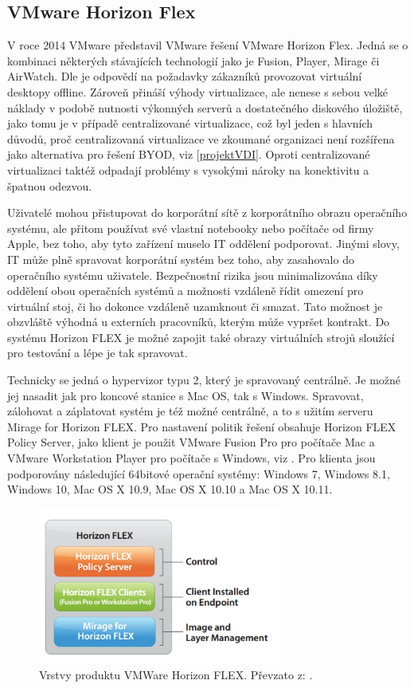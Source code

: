 \subsection{VMware Horizon Flex}
V roce 2014 VMware představil VMware řešení VMware Horizon Flex. Jedná se o kombinaci některých stávajících technologií jako je Fusion, Player, Mirage či AirWatch. Dle \cite{GartnerFlex} je odpovědí na požadavky zákazníků provozovat virtuální desktopy offline. Zároveň přináší výhody virtualizace, ale nenese s sebou velké náklady v podobě nutnosti výkonných serverů a dostatečného diskového úložiště, jako tomu je v případě centralizované virtualizace, což byl jeden s hlavních důvodů, proč centralizovaná virtualizace ve zkoumané organizaci není rozšířena jako alternativa pro řešení BYOD, viz \ref{projektVDI}. Oproti centralizované virtualizaci taktéž odpadají problémy s vysokými nároky na konektivitu a špatnou odezvou.

Uživatelé mohou přistupovat do korporátní sítě z korporátního obrazu operačního systému, ale přitom používat své vlastní notebooky nebo počítače od firmy Apple, bez toho, aby tyto zařízení muselo IT oddělení podporovat. Jinými slovy, IT může plně spravovat korporátní systém bez toho, aby zasahovalo do operačního systému uživatele. Bezpečnostní rizika jsou minimalizována díky oddělení obou operačních systémů a možnosti vzdáleně řídit omezení pro virtuální stoj, či ho dokonce vzdáleně uzamknout či smazat. Tato možnost je obzvláště výhodná u externích pracovníků, kterým může vypršet kontrakt. Do systému Horizon FLEX je možné zapojit také obrazy virtuálních strojů sloužící pro testování a lépe je tak spravovat.

Technicky se jedná o hypervizor typu 2, který je spravovaný centrálně. Je možné jej nasadit jak pro koncové stanice s Mac OS, tak s Windows. Spravovat, zálohovat a záplatovat systém je též možné centrálně, a to s užitím serveru Mirage for Horizon FLEX. Pro nastavení politik řešení obsahuje Horizon FLEX Policy Server, jako klient je použit VMware Fusion Pro pro počítače Mac a VMware Workstation Player pro počítače s Windows, viz \cite{FlexBrief}. 
Pro klienta jsou podporovány následující 64bitové operační systémy: Windows 7, Windows 8.1, Windows 10, Mac OS X 10.9, Mac OS X 10.10 a Mac OS X 10.11.

 \begin{figure}[h!]
 \centering
\includegraphics[width=8cm]{img/FlexVrstvy}
\caption{Vrstvy produktu VMWare Horizon FLEX. Převzato z: \cite{FlexBrief}.} 
\label{FlexVrstvy}
\end{figure}


